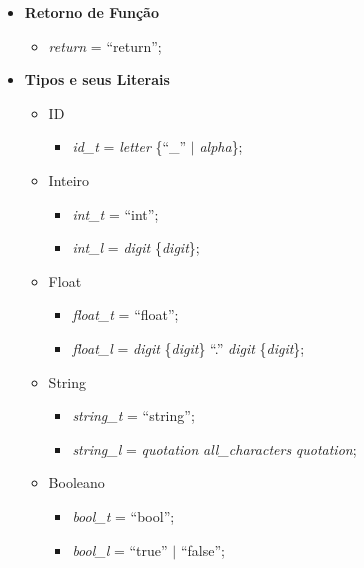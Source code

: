 \documentclass[12pt, a4paper]{IEEEtran}
\begin{document}
\begin{itemize}
\item \textbf{Retorno de Função}
  \begin{itemize}
  \item \emph{return} = ``return'';
  \end{itemize}
\end{itemize}
\begin{itemize}
\item \textbf{Tipos e seus Literais}
  \begin{itemize}
  \item \textsf{ID}
    \begin{itemize}
    \item \emph{id\_t} = \emph{letter} \{``\_'' $|$ \emph{alpha}\};
    \end{itemize}
  \end{itemize}
  \begin{itemize}
  \item \textsf{Inteiro}
    \begin{itemize}
    \item \emph{int\_t} = ``int'';
    \item \emph{int\_l} = \emph{digit} \{\emph{digit}\};
    \end{itemize}
  \end{itemize}
  \begin{itemize}
  \item \textsf{Float}
    \begin{itemize}
    \item \emph{float\_t} = ``float'';
    \item \emph{float\_l} = \emph{digit} \{\emph{digit}\} ``.'' \emph{digit}
      \{\emph{digit}\};
    \end{itemize}
  \end{itemize}
  \begin{itemize}
  \item \textsf{String}
    \begin{itemize}
    \item \emph{string\_t} = ``string'';
    \item \emph{string\_l} = \emph{quotation} {\emph{all\_characters}}
      \emph{quotation};
    \end{itemize}
  \end{itemize}

  \begin{itemize}
  \item \textsf{Booleano}
    \begin{itemize}
    \item \emph{bool\_t} = ``bool'';
    \item \emph{bool\_l} = ``true'' $|$ ``false'';
    \end{itemize}
  \end{itemize}


\end{itemize}
\end{document}
